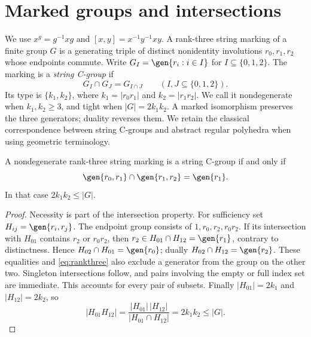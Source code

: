 \section{Marked groups and intersections}
We use $x^g=g^{-1}xg$ and $[x,y]=x^{-1}y^{-1}xy$.
A rank-three string marking of a finite group $G$ is a generating triple
of distinct nonidentity involutions $r_0,r_1,r_2$ whose endpoints commute.
Write $G_I=\gen{r_i:i\in I}$ for $I\subseteq\{0,1,2\}$.
The marking is a \emph{string C-group} if
\[
 G_I\cap G_J=G_{I\cap J}\qquad(I,J\subseteq\{0,1,2\}).
\]
Its type is $\{k_1,k_2\}$, where $k_1=|r_0r_1|$ and
$k_2=|r_1r_2|$. We call it nondegenerate when $k_1,k_2\geq3$,
and tight when $|G|=2k_1k_2$. A marked isomorphism preserves the
three generators; duality reverses them. We retain the classical
correspondence between string C-groups and abstract regular polyhedra
when using geometric terminology.


\begin{lemma}\label{UF.RankThree}
A nondegenerate rank-three string marking is a string C-group if and
only if
\begin{equation}\label{eq:rankthree}
 \gen{r_0,r_1}\cap\gen{r_1,r_2}=\gen{r_1}.
\end{equation}
In that case $2k_1k_2\leq |G|$.
\end{lemma}
\begin{proof}
Necessity is part of the intersection property. For sufficiency set
$H_{ij}=\gen{r_i,r_j}$. The endpoint group consists of
$1,r_0,r_2,r_0r_2$. If its intersection with $H_{01}$ contains $r_2$
or $r_0r_2$, then $r_2\in H_{01}\cap H_{12}=\gen{r_1}$,
contrary to distinctness. Hence
$H_{02}\cap H_{01}=\gen{r_0}$; dually
$H_{02}\cap H_{12}=\gen{r_2}$. These equalities and
\eqref{eq:rankthree} also exclude a generator from the group on the
other two. Singleton intersections follow, and pairs involving the
empty or full index set are immediate. This accounts for every pair
of subsets. Finally $|H_{01}|=2k_1$ and $|H_{12}|=2k_2$, so
\[
 |H_{01}H_{12}|=\frac{|H_{01}|\,|H_{12}|}{|H_{01}\cap H_{12}|}
 =2k_1k_2\leq |G|.
\]
\end{proof}

